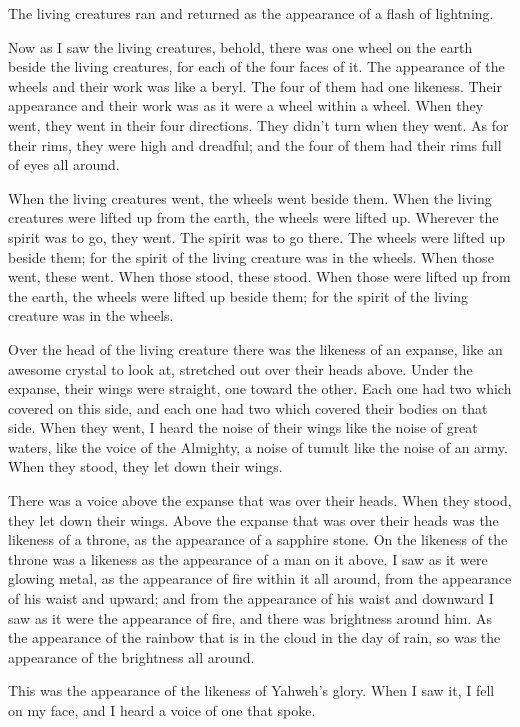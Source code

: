 {The living creatures ran and returned as the appearance of a flash of lightning.
\par }{\PP {}Now as I saw the living creatures, behold, there was one wheel on the earth beside the living creatures, for each of the four faces of it.
The appearance of the wheels and their work was like a beryl. The four of them had one likeness. Their appearance and their work was as it were a wheel within a wheel.
When they went, they went in their four directions. They didn’t turn when they went.
As for their rims, they were high and dreadful; and the four of them had their rims full of eyes all around.
\par }{\PP {}When the living creatures went, the wheels went beside them. When the living creatures were lifted up from the earth, the wheels were lifted up.
Wherever the spirit was to go, they went. The spirit was to go there. The wheels were lifted up beside them; for the spirit of the living creature was in the wheels.
When those went, these went. When those stood, these stood. When those were lifted up from the earth, the wheels were lifted up beside them; for the spirit of the living creature was in the wheels.
\par }{\PP {}Over the head of the living creature there was the likeness of an expanse, like an awesome crystal to look at, stretched out over their heads above.
Under the expanse, their wings were straight, one toward the other. Each one had two which covered on this side, and each one had two which covered their bodies on that side.
When they went, I heard the noise of their wings like the noise of great waters, like the voice of the Almighty, a noise of tumult like the noise of an army. When they stood, they let down their wings.
\par }{\PP {}There was a voice above the expanse that was over their heads. When they stood, they let down their wings.
Above the expanse that was over their heads was the likeness of a throne, as the appearance of a sapphire stone. On the likeness of the throne was a likeness as the appearance of a man on it above.
I saw as it were glowing metal, as the appearance of fire within it all around, from the appearance of his waist and upward; and from the appearance of his waist and downward I saw as it were the appearance of fire, and there was brightness around him.
As the appearance of the rainbow that is in the cloud in the day of rain, so was the appearance of the brightness all around.
\par }{\PP This was the appearance of the likeness of Yahweh’s glory. When I saw it, I fell on my face, and I heard a voice of one that spoke.

}
